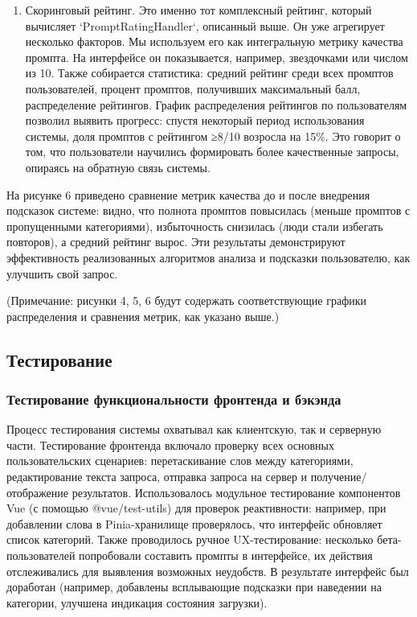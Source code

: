 \begin{enumerate}[label=\arabic*.]
\item Скоринговый рейтинг. Это именно тот комплексный рейтинг, который вычисляет `PromptRatingHandler`, описанный выше. Он уже агрегирует несколько факторов. Мы используем его как интегральную метрику качества промпта. На интерфейсе он показывается, например, звездочками или числом из 10. Также собирается статистика: средний рейтинг среди всех промптов пользователей, процент промптов, получивших максимальный балл, распределение рейтингов. График распределения рейтингов по пользователям позволил выявить прогресс: спустя некоторый период использования системы, доля промптов с рейтингом ≥8/10 возросла на 15\%. Это говорит о том, что пользователи научились формировать более качественные запросы, опираясь на обратную связь системы.
\end{enumerate}
На рисунке 6 приведено сравнение метрик качества до и после внедрения подсказок системе: видно, что полнота промптов повысилась (меньше промптов с пропущенными категориями), избыточность снизилась (люди стали избегать повторов), а средний рейтинг вырос. Эти результаты демонстрируют эффективность реализованных алгоритмов анализа и подсказки пользователю, как улучшить свой запрос.

(Примечание: рисунки 4, 5, 6 будут содержать соответствующие графики распределения и сравнения метрик, как указано выше.)

\subsection{Тестирование}

\subsubsection{Тестирование функциональности фронтенда и бэкэнда}

Процесс тестирования системы охватывал как клиентскую, так и серверную части. Тестирование фронтенда включало проверку всех основных пользовательских сценариев: перетаскивание слов между категориями, редактирование текста запроса, отправка запроса на сервер и получение/отображение результатов. Использовалось модульное тестирование компонентов Vue (с помощью @vue/test-utils) для проверок реактивности: например, при добавлении слова в Pinia-хранилище проверялось, что интерфейс обновляет список категорий. Также проводилось ручное UX-тестирование: несколько бета-пользователей попробовали составить промпты в интерфейсе, их действия отслеживались для выявления возможных неудобств. В результате интерфейс был доработан (например, добавлены всплывающие подсказки при наведении на категории, улучшена индикация состояния загрузки).

